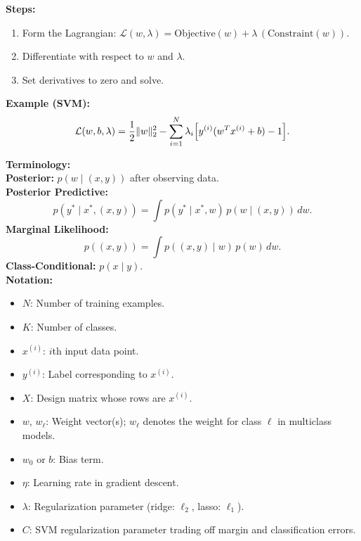\documentclass[10pt,landscape]{article}
\begin{document}
\begin{multicols}{3}
\begin{tcolorbox}[breakable, title=Lagrangian Method]
\textbf{Steps:}
\begin{enumerate}[noitemsep, topsep=0pt]
  \item Form the Lagrangian: \(\mathcal{L}(w,\lambda)=\text{Objective}(w)+\lambda\,(\text{Constraint}(w))\).
  \item Differentiate with respect to \(w\) and \(\lambda\).
  \item Set derivatives to zero and solve.
\end{enumerate}
\textbf{Example (SVM):}
\[
\mathcal{L}(w,b,\lambda)=\frac{1}{2}\|w\|_2^2-\sum_{i=1}^N\lambda_i\Bigl[y^{(i)}(w^Tx^{(i)}+b)-1\Bigr].
\]
\end{tcolorbox}

\begin{tcolorbox}[breakable, title=Terminology \& Notation]
\textbf{Terminology:}\\[1mm]
\textbf{Posterior:} \(p(w\mid(x,y))\) after observing data.\\[1mm]
\textbf{Posterior Predictive:}
\[
p(y^*\mid x^*,(x,y))=\int p(y^*\mid x^*,w)\,p(w\mid(x,y))\,dw.
\]
\textbf{Marginal Likelihood:}
\[
p((x,y))=\int p((x,y)\mid w)\,p(w)\,dw.
\]
\textbf{Class-Conditional:} \(p(x\mid y)\).\\[2mm]
\textbf{Notation:}\\[1mm]
\begin{itemize}[noitemsep, topsep=0pt]
    \item \(N\): Number of training examples.
    \item \(K\): Number of classes.
    \item \(x^{(i)}\): \(i\)th input data point.
    \item \(y^{(i)}\): Label corresponding to \(x^{(i)}\).
    \item \(X\): Design matrix whose rows are \(x^{(i)}\).
    \item \(w\), \(w_\ell\): Weight vector(s); \(w_\ell\) denotes the weight for class \(\ell\) in multiclass models.
    \item \(w_0\) or \(b\): Bias term.
    \item \(\eta\): Learning rate in gradient descent.
    \item \(\lambda\): Regularization parameter (ridge: \(\ell_2\), lasso: \(\ell_1\)).
    \item \(C\): SVM regularization parameter trading off margin and classification errors.

\end{itemize}
\end{tcolorbox}
\end{multicols}
\end{document}
